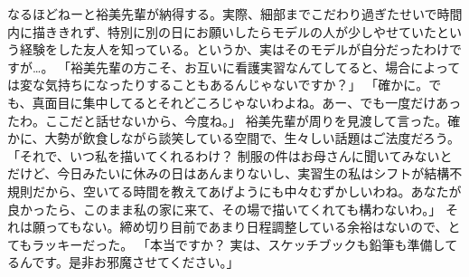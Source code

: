 なるほどねーと裕美先輩が納得する。実際、細部までこだわり過ぎたせいで時間内に描ききれず、特別に別の日にお願いしたらモデルの人が少しやせていたという経験をした友人を知っている。というか、実はそのモデルが自分だったわけですが…。
「裕美先輩の方こそ、お互いに看護実習なんてしてると、場合によっては変な気持ちになったりすることもあるんじゃないですか？」
「確かに。でも、真面目に集中してるとそれどころじゃないわよね。あー、でも一度だけあったわ。ここだと話せないから、今度ね。」
裕美先輩が周りを見渡して言った。確かに、大勢が飲食しながら談笑している空間で、生々しい話題はご法度だろう。
「それで、いつ私を描いてくれるわけ？ 制服の件はお母さんに聞いてみないとだけど、今日みたいに休みの日はあんまりないし、実習生の私はシフトが結構不規則だから、空いてる時間を教えてあげようにも中々むずかしいわね。あなたが良かったら、このまま私の家に来て、その場で描いてくれても構わないわ。」
それは願ってもない。締め切り目前であまり日程調整している余裕はないので、とてもラッキーだった。
「本当ですか？ 実は、スケッチブックも鉛筆も準備してるんです。是非お邪魔させてください。」

